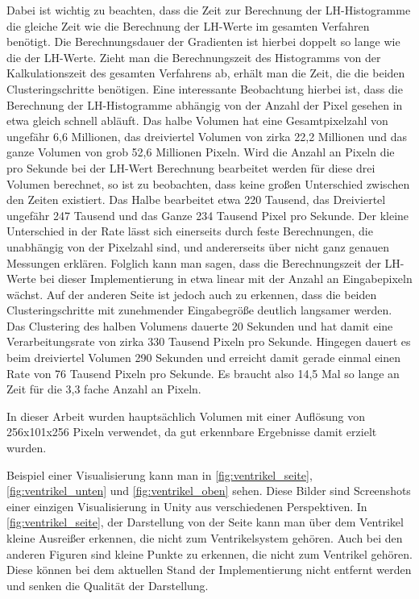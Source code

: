 Dabei ist wichtig zu beachten, dass die Zeit zur Berechnung der LH-Histogramme die gleiche Zeit wie die Berechnung der LH-Werte im gesamten Verfahren benötigt. Die Berechnungsdauer der Gradienten ist hierbei doppelt so lange wie die der LH-Werte. Zieht man die Berechnungszeit des Histogramms von der Kalkulationszeit des gesamten Verfahrens ab, erhält man die Zeit, die die beiden Clusteringschritte benötigen.
\newline
Eine interessante Beobachtung hierbei ist, dass die Berechnung der LH-Histogramme abhängig von der Anzahl der Pixel gesehen in etwa gleich schnell abläuft. Das halbe Volumen hat eine Gesamtpixelzahl von ungefähr 6,6 Millionen, das dreiviertel Volumen von zirka 22,2 Millionen und das ganze Volumen von grob 52,6 Millionen Pixeln. Wird die Anzahl an Pixeln die pro Sekunde bei der LH-Wert Berechnung bearbeitet werden für diese drei Volumen berechnet, so ist zu beobachten, dass keine großen Unterschied zwischen den Zeiten existiert. Das Halbe bearbeitet etwa 220 Tausend, das Dreiviertel ungefähr 247 Tausend und das Ganze 234 Tausend Pixel pro Sekunde. Der kleine Unterschied in der Rate lässt sich einerseits durch feste Berechnungen, die unabhängig von der Pixelzahl sind, und andererseits über nicht ganz genauen Messungen erklären. Folglich kann man sagen, dass die Berechnungszeit der LH-Werte bei dieser Implementierung in etwa linear mit der Anzahl an Eingabepixeln wächst.
\newline
Auf der anderen Seite ist jedoch auch zu erkennen, dass die beiden Clusteringschritte mit zunehmender Eingabegröße deutlich langsamer werden. Das Clustering des halben Volumens dauerte 20 Sekunden und hat damit eine Verarbeitungsrate von zirka 330 Tausend Pixeln pro Sekunde. Hingegen dauert es beim dreiviertel Volumen 290 Sekunden und erreicht damit gerade einmal einen Rate von 76 Tausend Pixeln pro Sekunde. Es braucht also 14,5 Mal so lange an Zeit für die 3,3 fache Anzahl an Pixeln.





 In dieser Arbeit wurden hauptsächlich Volumen mit einer Auflösung von 256x101x256 Pixeln verwendet, da gut erkennbare Ergebnisse damit erzielt wurden.

Beispiel einer Visualisierung kann man in \autoref{fig:ventrikel_seite}, \autoref{fig:ventrikel_unten} und \autoref{fig:ventrikel_oben} sehen. Diese Bilder sind Screenshots einer einzigen Visualisierung in Unity aus verschiedenen Perspektiven. In \autoref{fig:ventrikel_seite}, der Darstellung von der Seite kann man über dem Ventrikel kleine Ausreißer erkennen, die nicht zum Ventrikelsystem gehören. Auch bei den anderen Figuren sind kleine Punkte zu erkennen, die nicht zum Ventrikel gehören. Diese können bei dem aktuellen Stand der Implementierung nicht entfernt werden und senken die Qualität der Darstellung. 

